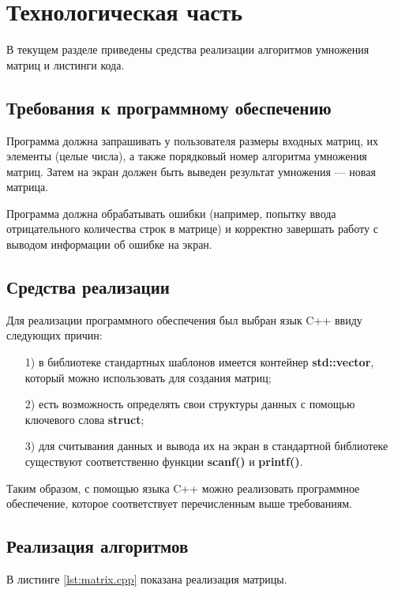 \chapter{Технологическая часть}

В текущем разделе приведены средства реализации алгоритмов умножения матриц и листинги кода.

\section{Требования к программному обеспечению}

Программа должна запрашивать у пользователя размеры входных матриц, их элементы (целые числа), а также порядковый номер алгоритма умножения матриц. Затем на экран должен быть выведен результат умножения --- новая матрица.

Программа должна обрабатывать ошибки (например, попытку ввода отрицательного количества строк в матрице) и корректно завершать работу с выводом информации об ошибке на экран.
 
\section{Средства реализации}

Для реализации программного обеспечения был выбран язык C++ ввиду следующих причин:

\begin{enumerate}
\item[1)]
в библиотеке стандартных шаблонов имеется контейнер \textbf{std::vector}, который можно использовать для создания матриц;
\item[2)]
есть возможность определять свои структуры данных с помощью ключевого слова \textbf{struct};
\item[3)]
для считывания данных и вывода их на экран в стандартной библиотеке существуют соответственно функции \textbf{scanf()} и \textbf{printf()}.
\end{enumerate}

Таким образом, с помощью языка C++ можно реализовать программное обеспечение, которое соответствует перечисленным выше требованиям.

\section{Реализация алгоритмов}

В листинге \ref{lst:matrix.cpp} показана реализация матрицы.

